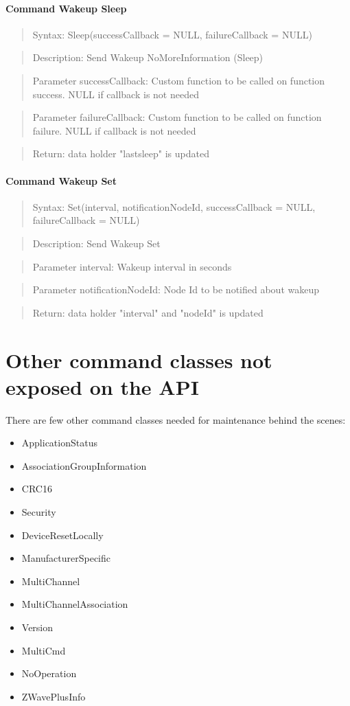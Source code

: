 \paragraph {Command Wakeup Sleep}
\begin{quote} Syntax: Sleep(successCallback = NULL, failureCallback = NULL)\end{quote}
\begin{quote} Description: Send Wakeup NoMoreInformation (Sleep)\end{quote}
\begin{quote} Parameter successCallback: Custom function to be called on function success. NULL if callback is not needed\end{quote}
\begin{quote} Parameter failureCallback: Custom function to be called on function failure. NULL if callback is not needed\end{quote}
\begin{quote} Return: data holder "lastsleep" is updated\end{quote}
 
\paragraph {Command Wakeup Set}
\begin{quote} Syntax: Set(interval, notificationNodeId, successCallback = NULL, failureCallback = NULL)\end{quote}
\begin{quote} Description: Send Wakeup Set\end{quote}
\begin{quote} Parameter interval: Wakeup interval in seconds\end{quote}
\begin{quote} Parameter notificationNodeId: Node Id to be notified about wakeup\end{quote}
\begin{quote} Return: data holder "interval" and "nodeId" is updated \end{quote}


\section{Other command classes not exposed on the API}

There are few other command classes needed for maintenance behind the scenes:

\begin{itemize}
\item ApplicationStatus	
\item AssociationGroupInformation
\item CRC16
\item Security
\item DeviceResetLocally		 
\item ManufacturerSpecific
\item MultiChannel
\item MultiChannelAssociation
\item Version
\item MultiCmd			
\item NoOperation			
\item ZWavePlusInfo
\end{itemize}